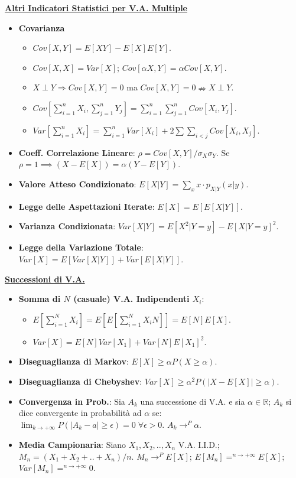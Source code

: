 \documentclass{article}
\begin{document}
\begin{multicols*}{3}
\textbf{\underline{Altri Indicatori Statistici per V.A. Multiple}}
\begin{itemize}
    \item \textbf{Covarianza}
    \begin{itemize}
        \item $Cov[X,Y]=E[XY]-E[X]E[Y]$.
        \item $Cov[X,X]=Var[X]$; $Cov[\alpha X,Y]=\alpha Cov[X,Y]$.
        \item $X\perp Y\Rightarrow Cov[X,Y]=0$ ma $Cov[X,Y]=0 \nRightarrow X\perp Y$.
        \item $Cov[\sum_{i=1}^{n}X_{i},\sum_{j=1}^{n}Y_{j}]=\sum_{i=1}^{n}\sum_{j=1}^{n}Cov[X_{i},Y_{j}]$.
        \item $Var[\sum_{i=1}^{n}X_{i}]=\sum_{i=1}^{n}Var[X_{i}]+2\sum \sum_{i<j}Cov[X_{i},X_{j}]$.
    \end{itemize}
    \item \textbf{Coeff. Correlazione Lineare}: $\rho =Cov[X,Y]/\sigma_{X}\sigma_{Y}$. Se $\rho=1\implies (X-E[X])=\alpha(Y-E[Y])$.
    \item \textbf{Valore Atteso Condizionato}: $E[X|Y]=\sum_{x}x\cdot p_{X|Y}(x|y)$.
    \item \textbf{Legge delle Aspettazioni Iterate}: $E[X]=E[E[X|Y]]$.
    \item \textbf{Varianza Condizionata}: $Var[X|Y]=E[X^{2}|Y=y]-E[X|Y=y]^{2}$.
    \item \textbf{Legge della Variazione Totale}: $Var[X]=E[Var[X|Y]]+Var[E[X|Y]]$.
\end{itemize}

\textbf{\underline{Successioni di V.A.}}
\begin{itemize}
    \item \textbf{Somma di $N$ (casuale) V.A. Indipendenti $X_{i}$}:
    \begin{itemize}
        \item $E[\sum_{i=1}^{N}X_{i}]=E[E[\sum_{i=1}^{N}X_{i}N]]=E[N]E[X]$.
        \item $Var[X]=E[N]Var[X_{1}]+Var[N]E[X_{1}]^{2}$.
    \end{itemize}
    \item \textbf{Diseguaglianza di Markov}: $E[X]\geq \alpha P(X\geq \alpha)$.
    \item \textbf{Diseguaglianza di Chebyshev}: $Var[X]\geq \alpha^{2} P(|X-E[X]|\geq \alpha)$.
    \item \textbf{Convergenza in Prob.}: Sia ${A_{k}}$ una successione di V.A. e sia $\alpha\in\mathbb{R}$; ${A_{k}}$ si dice convergente in probabilità ad $\alpha$ se: $\lim_{k\rightarrow +\infty}P(|A_{k}-a|\geq\epsilon)=0\;\forall\epsilon >0$. $A_{k}\rightarrow^{P}\alpha$.
    \item \textbf{Media Campionaria}: Siano $X_{1},X_{2},..,X_{n}$ V.A. I.I.D.; $M_{n}=(X_{1}+X_{2}+..+X_{n})/n$. $M_{n}\rightarrow^{P} E[X]$; $E[M_{n}]=^{n\rightarrow +\infty}E[X]$; $Var[M_{n}]=^{n\rightarrow +\infty}0$.
\end{itemize}


\end{multicols*}
\end{document}

